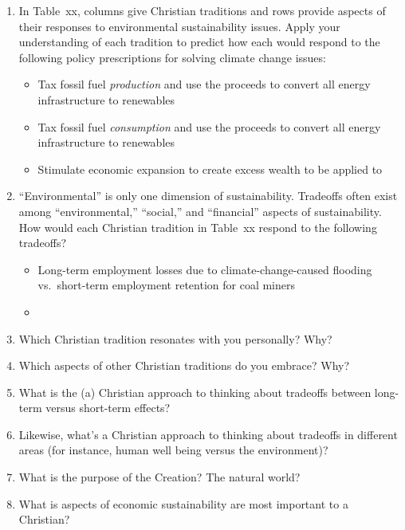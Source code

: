 \documentclass[12pt]{article}
\begin{document}
%
\begin{enumerate}

  \item In Table~xx, columns give Christian traditions
        and rows provide aspects of their responses
		to environmental sustainability issues. 
		Apply your understanding of each tradition to 
		predict how each would respond to the following policy prescriptions
		for solving climate change issues:
		\begin{itemize}

		  \item Tax fossil fuel \emph{production} and use the proceeds to 
		        convert all energy infrastructure to renewables
		  
		  \item Tax fossil fuel \emph{consumption} and use the proceeds to 
		        convert all energy infrastructure to renewables

		  \item Stimulate economic expansion to create excess wealth to be applied to 

		\end{itemize}
  \item ``Environmental'' is only one dimension of sustainability. 
        Tradeoffs often exist among ``environmental,'' ``social,'' and ``financial'' 
		aspects of sustainability. 
		How would each Christian tradition in Table~xx respond to the following tradeoffs?
		\begin{itemize}

		  \item Long-term employment losses due to climate-change-caused flooding vs.\ 
		        short-term employment retention for coal miners

		  \item

		\end{itemize}
  \item Which Christian tradition resonates with you personally? Why?
  
  \item Which aspects of other Christian traditions do you embrace? Why?
\item What is the (a) Christian approach to thinking about tradeoffs between long-term versus short-term effects?
\item Likewise, what's a Christian approach to thinking about tradeoffs in different areas (for instance, human well being versus the environment)?
\item What is the purpose of the Creation? The natural world?
\item What is aspects of economic sustainability are most important to a Christian?

\end{enumerate}
%



\printbibliography
\end{document}
